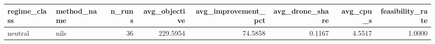 \begin{tabular}{llrrrrrr}
\toprule
regime_class & method_name & n_runs & avg_objective & avg_improvement_pct & avg_drone_share & avg_cpu_s & feasibility_rate \\
\midrule
neutral & nils & 36 & 229.5954 & 74.5858 & 0.1167 & 4.5517 & 1.0000 \\
\bottomrule
\end{tabular}
